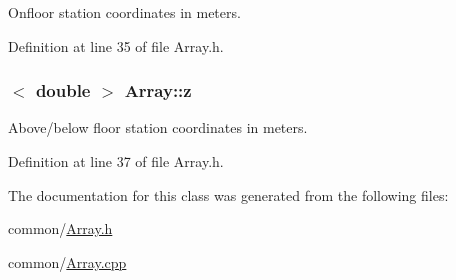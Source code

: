 Onfloor station coordinates in meters. 



Definition at line 35 of file Array.h.

\hypertarget{classArray_a88520c63d208d8c2531d06ee26d8dddf}{
\subsubsection[{z}]{$<$ double $>$ {\bf Array::z}}}
\label{classArray_a88520c63d208d8c2531d06ee26d8dddf}


Above/below floor station coordinates in meters. 



Definition at line 37 of file Array.h.



The documentation for this class was generated from the following files:\begin{DoxyCompactItemize}
\item 
common/\hyperlink{Array_8h}{Array.h}\item 
common/\hyperlink{Array_8cpp}{Array.cpp}\end{DoxyCompactItemize}
